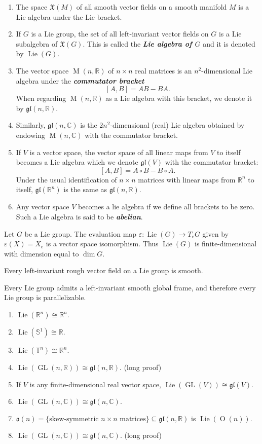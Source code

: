 \documentclass{article}
\numberwithin{equation}{section}
\newcommand{\R}{\mathbb{R}}
\newcommand{\C}{\mathbb{C}}
\newcommand{\T}{\mathbb{T}}
\newcommand{\X}{\mathfrak{X}}
\newcommand{\glf}{\mathfrak{gl}}
\newcommand{\of}{\mathfrak{o}}
\renewcommand{\O}{\operatorname{O}}
\renewcommand{\S}{\mathbb{S}}
\renewcommand{\T}{\mathbb{T}}
\DeclareMathOperator{\Lie}{\operatorname{Lie}}
\DeclareMathOperator{\GL}{GL}
\DeclareMathOperator{\M}{M}
\begin{document}
\begin{example}\leavevmode
	\begin{enumerate}
		\item The space $\X(M)$ of all smooth vector fields on a smooth manifold $M$ is a Lie algebra under the Lie bracket.
		\item If $G$ is a Lie group, the set of all left-invariant vector fields on $G$ is a Lie subalgebra of $\X(G)$. This is called the \textbf{\textit{Lie algebra of $G$}} and it is denoted by $\Lie(G)$.
		\item The vector space $\M(n,\R)$ of $n\times n$ real matrices is an $n^2$-dimensional Lie algebra under the \textbf{\textit{commutator bracket}}
		\[[A,B]=AB-BA.\]
		When regarding $\M(n,\R)$ as a Lie algebra with this bracket, we denote it by $\glf(n,\R)$.
		\item Similarly, $\glf(n,\C)$ is the $2n^2$-dimensional (real) Lie algebra obtained by endowing $\M(n,\C)$ with the commutator bracket.
		\item If $V$ is a vector space, the vector space of all linear maps from $V$ to itself becomes a Lie algebra which we denote $\glf(V)$ with the commutator bracket:
		\[[A,B]=A\circ B-B\circ A.\]
		Under the usual identification of $n\times n$ matrices with linear maps from $\R^n$ to itself, $\glf(\R^n)$ is the same as $\glf(n,\R)$.
		\item Any vector space $V$ becomes a lie algebra if we define all brackets to be zero. Such a Lie algebra is said to be \textbf{\textit{abelian}}.
	\end{enumerate}
\end{example}
\begin{thm}
	Let $G$ be a Lie group. The evaluation map $\varepsilon:\Lie(G)\to T_eG$ given by $\varepsilon(X)=X_e$ is a vector space isomorphism. Thus $\Lie(G)$ is finite-dimensional with dimension equal to $\dim G$.
\end{thm}
\begin{coro}
	Every left-invariant rough vector field on a Lie group is smooth.
\end{coro}
\begin{coro}
	Every Lie group admits a left-invariant smooth global frame, and therefore every Lie group is parallelizable.
\end{coro}
\begin{example}\leavevmode
	\begin{enumerate}
		\item $\Lie(\R^n)\cong\R^n$.
		\item $\Lie(\S^1)\cong\R$.
		\item $\Lie(\T^n)\cong\R^n$.
		\item $\Lie(\GL(n,\R))\cong\glf(n,\R)$. (long proof)
		\item If $V$ is any finite-dimensional real vector space, $\Lie(\GL(V))\cong\glf(V)$.
		\item $\Lie(\GL(n,\C))\cong\glf(n,\C)$.
		\item $\of(n)=\{\text{skew-symmetric }n\times n\text{ matrices}\}\subseteq\glf(n,\R)$ is $\Lie(\O(n))$.
		\item $\Lie(\GL(n,\C))\cong\glf(n,\C)$. (long proof)
	\end{enumerate}
\end{example}
\end{document}
